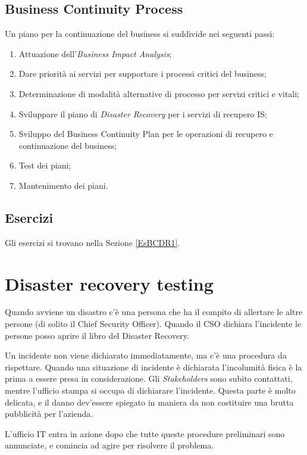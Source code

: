 \subsection{Business Continuity Process}

Un piano per la continuazione del business si suddivide nei seguenti passi:
\begin{enumerate}
  \item Attuazione dell'\textit{Business Impact Analysis};
  \item Dare priorità ai servizi per supportare i processi critici del 
  business;
  \item Determinazione di modalità alternative di processo per servizi critici
  e vitali;
  \item Sviluppare il piano di \textit{Disaster Recovery} per i servizi di
  recupero IS;
  \item Sviluppo del Business Continuity Plan per le operazioni di recupero e
  continuazione del business;
  \item Test dei piani;
  \item Mantenimento dei piani.
\end{enumerate}

\subsection{Esercizi}

Gli esercizi si trovano nella Sezione \ref{EsBCDR1}.

\section{Disaster recovery testing}

Quando avviene un disastro c'è una persona che ha il compito di allertare le
altre persone (di solito il Chief Security Officer). Quando il CSO dichiara 
l'incidente le persone posso aprire il libro del Disaster Recovery.

Un incidente non viene dichiarato immediatamente, ma c'è una procedura da
rispettare. Quando una situazione di incidente è dichiarata l'incolumità fisica
è la prima a essere presa in considerazione. Gli \textit{Stakeholders} sono
subito contattati, mentre l'ufficio stampa si occupa di dichiarare l'incidente.
Questa parte è molto delicata, e il danno dev'essere spiegato in maniera da non
costituire una brutta pubblicità per l'azienda.

L'ufficio IT entra in azione dopo che tutte queste procedure preliminari sono
annunciate, e comincia ad agire per risolvere il problema.

